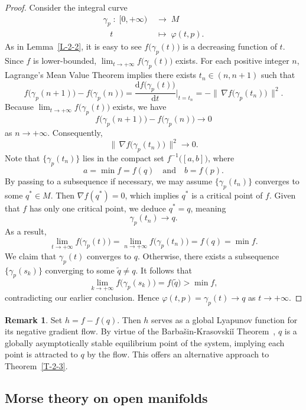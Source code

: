 \documentclass[11pt,letterpaper]{amsart}
\theoremstyle{plain}
\theoremstyle{definition}
\newtheorem{remark}[theorem]{Remark}
\theoremstyle{remark}
\numberwithin{equation}{section}
\begin{document}
\begin{proof}
Consider the integral curve
\[
\begin{aligned}
\gamma_p\;:\;[0,+\infty)\;&\longrightarrow\; M\\
\;\;\;t\quad\;&\longmapsto\;\varphi(t,p).
\end{aligned}
\]
As in Lemma~\ref{L-2-2}, it is easy to see  $f\big(\gamma_p(t)\big)$ is a decreasing function of $t$. Since $f$ is lower-bounded,   $\lim_{t\to+\infty}f\big(\gamma_p(t)\big)$ exists. For each positive integer $n$, Lagrange's Mean Value Theorem implies there exists $t_n\in(n,n+1)$ such that
\[
f\big(\gamma_p(n+1)\big)-f\big(\gamma_p(n)\big)
=\frac{\mathrm{d}f\big(\gamma_p(t)\big)}{\mathrm{d}t}\bigg|_{t=t_n}
=-\|\, \nabla f\big(\gamma_p(t_n)\big)\,\|^2.
\]
Because $\lim_{t\to+\infty}f\big(\gamma_p(t)\big)$ exists, we have
\[
f\big(\gamma_p(n+1)\big)-f\big(\gamma_p(n)\big)\to 0
\]
as $n\to+\infty$. Consequently,
\[
\|\,\nabla f\big(\gamma_p(t_n)\big)\,\|^2\to 0.
\]
Note that $\big\{\gamma_p(t_n)\big\}$ lies in the compact set $f^{-1}\big([a,b]\big)$,
where
\[
a=\min f=f(q)\quad\text{and}\quad b=f(p).
\]
By passing to a subsequence if necessary, we may assume $\big\{\gamma_p(t_n)\big\}$ converges to some $q^\ast\in M$. Then $\nabla f (q^\ast)=0$, which implies $q^\ast$ is a critical point of $f$. Given that $f$ has only one critical point, we deduce $q^\ast=q$, meaning
\[
\gamma_p(t_n)\to q.
\]
As a result,
\[
\lim_{t\to+\infty}f\big(\gamma_p(t)\big)
=\lim_{n\to+\infty}f\big(\gamma_p(t_n)\big)=f(q)=\min f.
\]
We claim that $\gamma_{p}(t)$ converges to $q$. Otherwise, there exists a subsequence $\big\{\gamma_{p}(s_k)\big\}$ converging to some $\tilde{q}\neq q$. It follows that
\[
\lim_{k\to+\infty}f\big(\gamma_p(s_k)\big)=f\big(\tilde{q}\big)>\min f,
\]
contradicting our earlier conclusion. Hence
$\varphi(t,p)=\gamma_p(t)\to q$ as $t\to+\infty$.
\end{proof}

\begin{remark}\label{R-2-4}
Set $h=f-f(q)$. Then $h$ serves as a global Lyapunov function for its negative gradient flow. By virtue of the Barba\v{s}in-Krasovski\v{i} Theorem~\cite{Barba-1954},  $q$ is a globally asymptotically stable equilibrium point of the system, implying each point is attracted to $q$ by the flow. This offers an alternative approach to Theorem~\ref{T-2-3}.
\end{remark}

\subsection{Morse theory on open manifolds}
\end{document}
